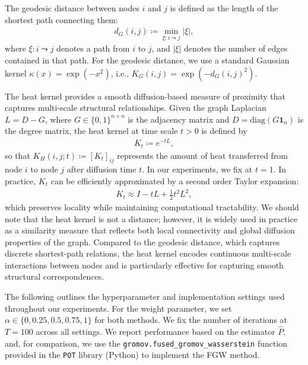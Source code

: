 \documentclass{article}
\begin{document}
The geodesic distance between nodes $i$ and $j$ is defined as the length of the shortest path connecting them:
\begin{align*}
	d_{G}(i,j) \coloneqq \min_{\xi: i \leadsto j} |\xi| ,
\end{align*}
where $\xi : i \leadsto j$ denotes a path from $i$ to $j$, and $|\xi|$ denotes the number of edges contained in that path. For the geodesic distance, we use a standard Gaussian kernel $\kappa(x) = \exp(-x^2)$, i.e., $K_G(i,j) = \exp(-d_G(i,j)^2)$.

The heat kernel provides a smooth diffusion-based measure of proximity that captures multi-scale structural relationships. Given the graph Laplacian $L = D - G$, where $G \in \{0,1\}^{n \times n}$ is the adjacency matrix and $D = \mathrm{diag}(G \mathbf{1}_n)$ is the degree matrix, 
the heat kernel at time scale $t > 0$ is defined by
\begin{align*}
	K_t \coloneqq e^{-tL} ,
\end{align*}
so that $K_H(i,j ; t) \coloneqq [K_t]_{ij}$ represents the amount of heat transferred from node $i$ to node $j$ after diffusion time $t$. In our experiments, we fix at $t=1$.
In practice, $K_t$ can be efficiently approximated by a second order Taylor expansion:
\begin{align*}
	K_t \approx I - tL + \tfrac{1}{2}t^2L^2 ,
\end{align*}
which preserves locality while maintaining computational tractability. We should note that the heat kernel is not a distance; however, it is widely used in practice as a similarity measure that reflects both local connectivity and global diffusion properties of the graph. Compared to the geodesic distance, which captures discrete shortest-path relations, the heat kernel encodes continuous multi-scale interactions between nodes and is particularly effective for capturing smooth structural correspondences.

The following outlines the hyperparameter and implementation settings used throughout our experiments. For the weight parameter, we set $\alpha \in \{0,0.25,0.5,0.75,1\}$ for both methods. 
We fix the number of iterations at $T=100$ across all settings. We report performance based on the estimator $\hat{P}$, and, for comparison, we use the \texttt{gromov.fused\_gromov\_wasserstein} function provided in the \texttt{POT} library (Python) to implement the FGW method.




\end{document}
